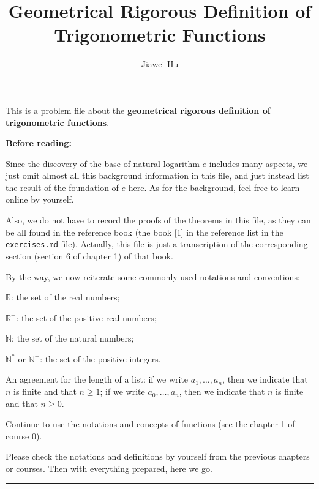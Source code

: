 \documentclass{article}
\title{\LARGE \textbf{Geometrical Rigorous Definition of Trigonometric Functions}}
\author{\large Jiawei Hu}
\begin{document}
\maketitle

This is a problem file about the \textbf{geometrical rigorous definition of trigonometric functions}.  

\begin{Rmk}{}
    \textbf{Before reading:}
    \begin{compactenum}
        \item Since the discovery of the base of natural logarithm $e$ includes many aspects, we just omit almost all this background information in this file, and just instead list the result of the foundation of $e$ here. As for the background, feel free to learn online by yourself.
        \item Also, we do not have to record the proofs of the theorems in this file, as they can be all found in the reference book (the book [1] in the reference list in the \verb|exercises.md| file). Actually, this file is just a transcription of the corresponding section (section 6 of chapter 1) of that book.
    \end{compactenum}
\end{Rmk}

By the way, we now reiterate some commonly-used notations and conventions:
\begin{compactenum}
    \item $\mathbb{R}$: the set of the real numbers;
    \item $\mathbb{R}^+$: the set of the positive real numbers;
    \item $\mathbb{N}$: the set of the natural numbers;
    \item $\mathbb{N^\ast}$ or $\mathbb{N}^+$: the set of the positive integers.
    \item An agreement for the length of a list: if we write $a_1, \dots, a_n$, then we indicate that $n$ is finite and that $n\geq 1$; if we write $a_0, \dots, a_n$, then we indicate that $n$ is finite and that $n\geq 0$.
    \item Continue to use the notations and concepts of functions (see the chapter 1 of course 0).
\end{compactenum} 
Please check the notations and definitions by yourself from the previous chapters or courses. Then with everything prepared, here we go.

\noindent\rule{\textwidth}{2pt}
\end{document}
